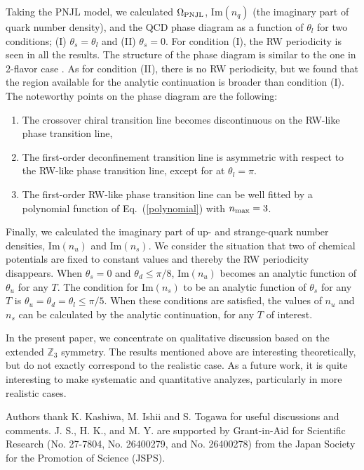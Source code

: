 \documentclass[prd,superscriptaddress,unsortedaddress,
twocolumn,showpacs,preprintnumbers,amsmath,amssymb]{revtex4}
\begin{document}
  Taking the PNJL model,
  we calculated $\Omega_{\rm PNJL}$, $\textrm{Im}\left(n_{q}\right)$ 
  (the imaginary part of quark number density), and the QCD phase diagram 
  as a function of $\theta_{l}$
  for two conditions; (I) $\theta_{s}=\theta_{l}$
  and (II) $\theta_{s}=0$. 
  For condition (I),
  the RW periodicity is seen in all the results.
  The structure of the phase diagram
  is similar to the one in 2-flavor case
  \cite{Sakai_JPhys}.
  As for condition (II),
  there is no RW periodicity,
  but we found that the region available for the analytic
  continuation is broader than condition (I).
  The noteworthy points on the phase diagram are the following: 
\begin{enumerate}
 \item  The crossover chiral transition line becomes
            discontinuous on the RW-like phase transition line,
 \item  The first-order deconfinement transition line
            is asymmetric with respect to the RW-like phase transition line,
            except for at $\theta_{l}=\pi$. 
 \item  The first-order RW-like phase transition line
            can be well fitted by a polynomial function of Eq.~(\ref{polynomial})
            with $n_{\rm max}=3$.
\end{enumerate}
  Finally, we calculated the imaginary
  part of up- and strange-quark number densities,
  $\textrm{Im}(n_{u})$ and $\textrm{Im}(n_{s})$. 
  We consider the situation that 
  two of chemical potentials are fixed to constant values
  and thereby the RW periodicity disappears.
  When $\theta_{s}=0$ and $\theta_{d}\le \pi/8$,
  $\textrm{Im}(n_{u})$ becomes an analytic function of $\theta_{u}$ 
  for any $T$. 
  The condition for $\textrm{Im}\left(n_{s}\right)$ to be 
  an analytic function of $\theta_{s}$ for any $T$ is 
  $\theta_{u}=\theta_{d}=\theta_{l}\le \pi/5$.
  When these conditions are satisfied, the values of $n_{u}$ and $n_{s}$ 
  can be calculated by the analytic continuation, for any $T$ of interest. 

  In the present paper, we concentrate on qualitative discussion based on
  the extended $\mathbb{Z}_{3}$ symmetry.
  The results mentioned above are interesting theoretically,
  but do not exactly correspond to the realistic case.
  As a future work, it is quite interesting to make systematic
  and quantitative analyzes, particularly in more realistic cases.

\noindent
\begin{acknowledgements}
Authors thank K. Kashiwa, M. Ishii and S. Togawa for useful discussions and comments.
J. S., H. K., and M. Y. are supported
by Grant-in-Aid for Scientific Research (No. 27-7804, No. 26400279, and No. 26400278)
from the Japan Society for the Promotion of Science (JSPS). 
\end{acknowledgements}
\end{document}

